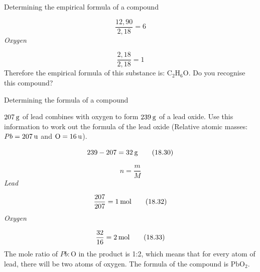 \begin{wex}{Determining the empirical formula of a compound }
{    \begin{equation}
    \frac{12,90}{2,18}=6\tag{18.28}
      \end{equation}
      \label{m38712*id281254}
        \textsl{Oxygen}
      \par 
      \label{m38712*id281261}\nopagebreak\noindent{}
        
    \begin{equation}
    \frac{2,18}{2,18}=1\tag{18.29}
      \end{equation}
      \label{m38712*id281292}Therefore the empirical formula of this substance is: ${\mathrm{C}}_{2}{\mathrm{H}}_{6}\mathrm{O}$. Do you recognise this compound?\par 
}
    \end{wex}
    \noindent
\label{m38712*secfhsst!!!underscore!!!id1235}\vspace{.5cm} 
      \noindent
      \begin{wex}{Determining the formula of a compound }{
      \label{m38712*probfhsst!!!underscore!!!id1236}
      \label{m38712*id281333}$207\phantom{\rule{2pt}{0ex}}\mathrm{g}$ of lead combines with oxygen to form $239\phantom{\rule{2pt}{0ex}}\mathrm{g}$ of a lead oxide. Use this information to work out the formula of the lead oxide (Relative atomic masses: $Pb=207\phantom{\rule{2pt}{0ex}}\mathrm{u}$ and $\mathrm{O}=16\phantom{\rule{2pt}{0ex}}\mathrm{u}$).\par 
}
{
      \label{m38712*id281379}\nopagebreak\noindent{}
    \begin{equation}
    239-207=32\phantom{\rule{2pt}{0ex}}\mathrm{g}\tag{18.30}
      \end{equation}
      \label{m38712*id281407}\nopagebreak\noindent{}
        
    \begin{equation}
    n=\frac{m}{M}\tag{18.31}
      \end{equation}
      \label{m38712*id281427}
        \textsl{Lead}
      \par 
      \label{m38712*id281433}\nopagebreak\noindent{}
        
    \begin{equation}
    \frac{207}{207}=1\phantom{\rule{2pt}{0ex}}\mathrm{mol}\tag{18.32}
      \end{equation}
      \label{m38712*id281460}
        \textsl{Oxygen}
      \par 
      \label{m38712*id281467}\nopagebreak\noindent{}
        
    \begin{equation}
    \frac{32}{16}=2\phantom{\rule{2pt}{0ex}}\mathrm{mol}\tag{18.33}
      \end{equation}
      \label{m38712*id281498}The mole ratio of $Pb:\mathrm{O}$ in the product is 1:2, which means that for every atom of lead, there will be two atoms of oxygen. The formula of the compound is $\mathrm{PbO}{}_{2}$.\par 
}
    \end{wex}
